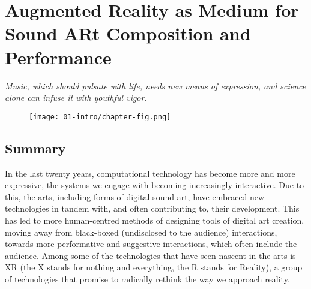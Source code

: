 \chapter{Augmented Reality as Medium for Sound ARt Composition and Performance}
\label{sec: introduction}
\epigraph{\emph{Music, which should pulsate with life, needs new means of expression, and science alone can infuse it with youthful vigor.}}{\citep{varese1966}}

\begin{figure}
    \centering
    \texttt{[image: 01-intro/chapter-fig.png]}
    \captionsetup{labelformat=empty}
    \caption[\autoref{sec: introduction}: \textit{polygons\textasciitilde{}} in performance at the Attenborough Centre for Creative Arts, University of Sussex, on June 8th, (from \citeauthor{bilbow2022a}, \citeyear{bilbow2022a})]{}
\end{figure}

\clearpage
\section{Summary}\label{sec: introduction-summary}
In the last twenty years, computational technology has become more and more expressive, the systems we engage with becoming increasingly interactive. Due to this, the arts, including forms of digital sound art, have embraced new technologies in tandem with, and often contributing to, their development. This has led to more human-centred methods of designing tools of digital art creation, moving away from black-boxed (undisclosed to the audience) interactions, towards more performative and suggestive interactions, which often include the audience. Among some of the technologies that have seen nascent in the arts is XR (the X stands for nothing and everything, the R stands for Reality), a group of technologies that promise to radically rethink the way we approach reality. 


